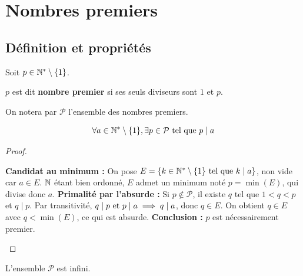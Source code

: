 \documentclass[12pt, a4paper]{report}
\begin{document}
\chapter{Nombres premiers}

\section{Définition et propriétés}

\begin{definition}
    Soit $p \in \mathbb{N}^*\setminus\{1\}$.

    $p$ est dit \textbf{nombre premier} si ses seuls diviseurs sont $1$ et $p$.

    On notera par $\mathcal{P}$ l'ensemble des nombres premiers.
\end{definition}

\begin{theorem}[Lemme]
    $$\forall a \in \mathbb{N}^*\setminus\{1\}, \exists p \in \mathcal{P} \text{ tel que } p \mid a$$
\end{theorem}

\begin{proof}
    \begin{outline}
        \1 \textbf{Candidat au minimum :} 
            \2 On pose $E = \{k \in \mathbb{N}^* \setminus \{1\} \text{ tel que } k \mid a\}$, non vide car $a \in E$. 
            \2 $\mathbb{N}$ étant bien ordonné, $E$ admet un minimum noté $p = \min(E)$, qui divise donc $a$.
        \1 \textbf{Primalité par l'absurde :} 
            \2 Si $p \notin \mathcal{P}$, il existe $q$ tel que $1 < q < p$ et $q \mid p$.
            \2 Par transitivité, $q \mid p \text{ et } p \mid a \implies q \mid a$, donc $q \in E$.
            \2 On obtient $q \in E$ avec $q < \min(E)$, ce qui est absurde.
        \1 \textbf{Conclusion :} $p$ est nécessairement premier.
    \end{outline}
\end{proof}

\begin{property}
    L'ensemble $\mathcal{P}$ est infini.
\end{property}
\end{document}
